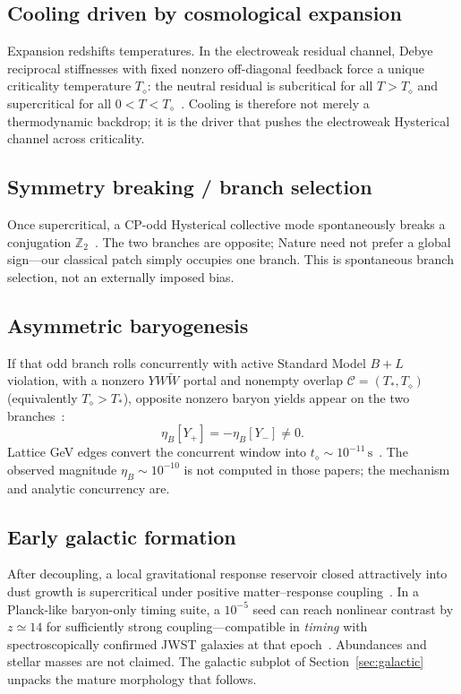 \documentclass[11pt]{article}
\newcommand{\Td}{T_{\diamond}}
\begin{document}
\subsection{Cooling driven by cosmological expansion}
Expansion redshifts temperatures.
In the electroweak residual channel, Debye reciprocal stiffnesses with fixed
nonzero off-diagonal feedback force a unique criticality temperature
$\Td$: the neutral residual is subcritical for all $T>\Td$ and supercritical for
all $0<T<\Td$~\cite{boyd2026cooling}.
Cooling is therefore not merely a thermodynamic backdrop; it is the driver that
pushes the electroweak Hysterical channel across criticality.

\subsection{Symmetry breaking / branch selection}
Once supercritical, a CP-odd Hysterical collective mode spontaneously breaks a
conjugation $\mathbb Z_2$~\cite{boyd2026branch}.
The two branches are opposite; Nature need not prefer a global sign---our classical
patch simply occupies one branch.
This is spontaneous branch selection, not an externally imposed bias.

\subsection{Asymmetric baryogenesis}
If that odd branch rolls concurrently with active Standard Model $B{+}L$
violation, with a nonzero $YW\widetilde W$ portal and nonempty overlap
$\mathcal C=(T_*,\Td)$ (equivalently $\Td>T_*$), opposite nonzero baryon yields
appear on the two branches~\cite{boyd2026cooling,boyd2026branch}:
\begin{equation}
\eta_B[Y_+]=-\eta_B[Y_-]\neq0.
\end{equation}
Lattice GeV edges convert the concurrent window into
$t_\diamond\sim10^{-11}\,\mathrm{s}$~\cite{boyd2026cooling,DOnofrio2014}.
The observed magnitude $\eta_B\sim10^{-10}$ is not computed in those papers; the
mechanism and analytic concurrency are.

\subsection{Early galactic formation}
After decoupling, a local gravitational response reservoir closed attractively into
dust growth is supercritical under positive matter--response
coupling~\cite{boyd2026early}.
In a Planck-like baryon-only timing suite, a $10^{-5}$ seed can reach nonlinear
contrast by $z\simeq14$ for sufficiently strong coupling---compatible in
\emph{timing} with spectroscopically confirmed JWST galaxies at that
epoch~\cite{boyd2026early,Carniani2024,Planck2018}.
Abundances and stellar masses are not claimed.
The galactic subplot of Section~\ref{sec:galactic} unpacks the mature morphology
that follows.
\end{document}
